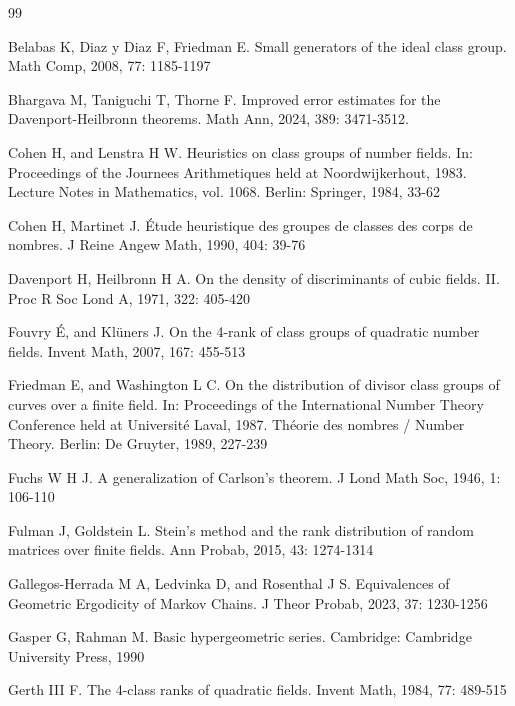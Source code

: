 \documentclass[a4]{amsart}
\theoremstyle{remark} \newtheorem{remark}[theorem]{Remark}
\begin{document}
\begin{thebibliography}{99}

Belabas K, Diaz y Diaz F, Friedman E. Small generators of the ideal class group. Math Comp, 2008, 77: 1185-1197

Bhargava M, Taniguchi T, Thorne F. Improved error estimates for the Davenport-Heilbronn theorems. Math Ann, 2024, 389: 3471-3512.

Cohen H, and Lenstra H W. Heuristics on class groups of number fields. In: Proceedings of the Journees Arithmetiques held at Noordwijkerhout, 1983. Lecture Notes in Mathematics, vol. 1068. Berlin: Springer, 1984, 33-62

Cohen H, Martinet J. \'Etude heuristique des groupes de classes des corps de nombres. J Reine Angew Math, 1990, 404: 39-76

Davenport H, Heilbronn H A. On the density of discriminants of cubic fields. II. Proc R Soc Lond A, 1971, 322: 405-420

Fouvry \'E, and Kl\"uners J. On the 4-rank of class groups of quadratic number fields. Invent Math, 2007, 167: 455-513

Friedman E, and Washington L C. On the distribution of divisor class groups of curves over a finite field. In: Proceedings of the International Number Theory Conference held at Universit\'e Laval, 1987. Th\'eorie des nombres / Number Theory. Berlin: De Gruyter, 1989, 227-239 

Fuchs W H J. A generalization of Carlson's theorem. J Lond Math Soc, 1946, 1: 106-110

Fulman J, Goldstein L. Stein's method and the rank distribution of random matrices over finite fields. Ann Probab, 2015, 43: 1274-1314

Gallegos-Herrada M A, Ledvinka D, and Rosenthal J S. Equivalences of Geometric Ergodicity of Markov Chains. J Theor Probab, 2023, 37: 1230-1256

Gasper G, Rahman M. Basic hypergeometric series. Cambridge: Cambridge University Press, 1990

Gerth III F. The 4-class ranks of quadratic fields. Invent Math, 1984, 77: 489-515


\end{thebibliography}
\end{document}
